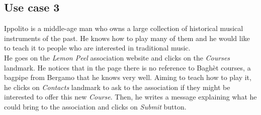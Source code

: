 \documentclass[../../DD.tex]{subfiles}
\begin{document}

		\newpage
		\subsection{Use case 3}
			Ippolito is a middle-age man who owns a large collection of historical musical instruments of the past. He knows how to play many of them and he would like to teach it to people who are interested in traditional music.\\
			He goes on the \textit{Lemon Peel} association website and clicks on the \textit{Courses} landmark. He notices that in the page there is no reference to Baghèt courses, a bagpipe from Bergamo that he knows very well. Aiming to teach how to play it, he clicks on \textit{Contacts} landmark to ask to the association if they might be interested to offer this new \textit{Course}. Then, he writes a message explaining what he could bring to the association and clicks on \textit{Submit} button.
			
\end{document}
